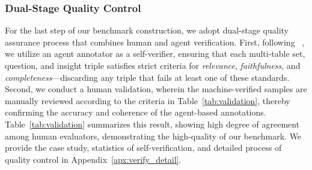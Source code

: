 \subsubsection{Dual-Stage Quality Control}
For the last step of our benchmark construction, we adopt dual-stage quality assurance process that combines human and agent verification. 
First, following ~\citet{tang2024multihoprag}, we utilize an agent annotator as a self-verifier, ensuring that each multi-table set, question, and insight triple satisfies strict criteria for \textit{relevance}, \textit{faithfulness}, and \textit{completeness}—discarding any triple that fails at least one of these standards.
Second, we conduct a human validation, wherein the machine-verified samples are manually reviewed according to the criteria in Table~\ref{tab:validation}, thereby confirming the accuracy and coherence of the agent-based annotations. 
Table~\ref{tab:validation} summarizes this result, showing high degree of agreement among human evaluators, demonstrating the high-quality of our benchmark.
We provide the case study, statistics of self-verification, and detailed process of quality control in Appendix~\ref{apx:verify_detail}.



